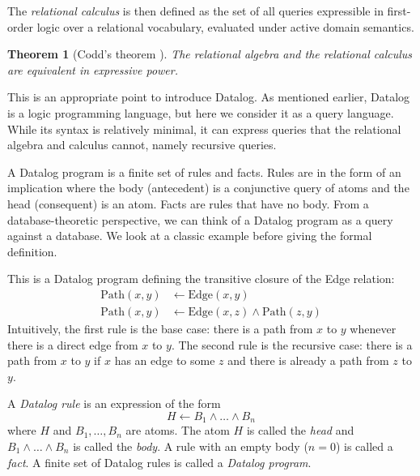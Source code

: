 \documentclass[oneside, 11pt]{amsbook}
\theoremstyle{plain}
\newtheorem{thm}{Theorem}[section]
\theoremstyle{definition}
\theoremstyle{remark}
\begin{document}
The \emph{relational calculus} is then defined as the set of all queries expressible in first-order logic over a relational vocabulary, evaluated under active domain semantics.

\begin{thm}[Codd's theorem \cite{Codd1972}]
    The relational algebra and the relational calculus are equivalent in expressive power.
\end{thm}

This is an appropriate point to introduce Datalog. As mentioned earlier, Datalog is a logic programming language, but here we consider it as a query language. While its syntax is relatively minimal, it can express queries that the relational algebra and calculus cannot, namely recursive queries.

A Datalog program is a finite set of rules and facts. Rules are in the form of an implication where the body (antecedent) is a conjunctive query of atoms and the head (consequent) is an atom. Facts are rules that have no body. From a database-theoretic perspective, we can think of a Datalog program as a query against a database. We look at a classic example before giving the formal definition.

\begin{exmpl}
    This is a Datalog program defining the transitive closure of the Edge relation:
    \[
        \begin{aligned}
            \text{Path}(x, y) & \leftarrow \text{Edge}(x, y)                         \\
            \text{Path}(x, y) & \leftarrow \text{Edge}(x, z) \land \text{Path}(z, y)
        \end{aligned}
    \]
    Intuitively, the first rule is the base case: there is a path from $x$ to $y$ whenever there is a direct edge from $x$ to $y$. The second rule is the recursive case: there is a path from $x$ to $y$ if $x$ has an edge to some $z$ and there is already a path from $z$ to $y$.
\end{exmpl}

\begin{defn}
    A \emph{Datalog rule} is an expression of the form
    \[
        H \leftarrow B_1 \land \dots \land B_n
    \]
    where $H$ and $B_1, \dots, B_n$ are atoms. The atom $H$ is called the \emph{head} and $B_1 \land \dots \land B_n$ is called the \emph{body}. A rule with an empty body ($n = 0$) is called a \emph{fact}. A finite set of Datalog rules is called a \emph{Datalog program}.
\end{defn}
\end{document}
